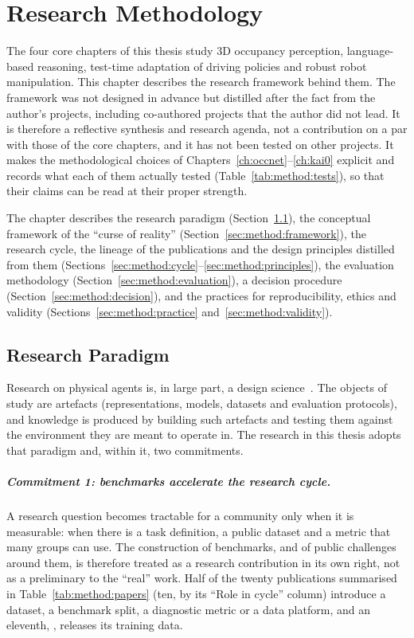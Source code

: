 \chapter{Research Methodology}\label{ch:methodology}

The four core chapters of this thesis study 3D occupancy perception, language-based reasoning, test-time adaptation of driving policies and robust robot manipulation. This chapter describes the research framework behind them. The framework was not designed in advance but distilled after the fact from the author's projects, including co-authored projects that the author did not lead. It is therefore a reflective synthesis and research agenda, not a contribution on a par with those of the core chapters, and it has not been tested on other projects. It makes the methodological choices of Chapters~\ref{ch:occnet}--\ref{ch:kai0} explicit and records what each of them actually tested (Table~\ref{tab:method:tests}), so that their claims can be read at their proper strength.

The chapter describes the research paradigm (Section~\ref{sec:method:paradigm}), the conceptual framework of the ``curse of reality'' (Section~\ref{sec:method:framework}), the research cycle, the lineage of the publications and the design principles distilled from them (Sections~\ref{sec:method:cycle}--\ref{sec:method:principles}), the evaluation methodology (Section~\ref{sec:method:evaluation}), a decision procedure (Section~\ref{sec:method:decision}), and the practices for reproducibility, ethics and validity (Sections~\ref{sec:method:practice} and~\ref{sec:method:validity}).

\section{Research Paradigm}\label{sec:method:paradigm}

Research on physical agents is, in large part, a design science~\cite{simon1996sciences,hevner2004design}. The objects of study are artefacts (representations, models, datasets and evaluation protocols), and knowledge is produced by building such artefacts and testing them against the environment they are meant to operate in. The research in this thesis adopts that paradigm and, within it, two commitments.

\paragraph{Commitment 1: benchmarks accelerate the research cycle.} A research question becomes tractable for a community only when it is measurable: when there is a task definition, a public dataset and a metric that many groups can use. The construction of benchmarks, and of public challenges around them, is therefore treated as a research contribution in its own right, not as a preliminary to the ``real'' work. Half of the twenty publications summarised in Table~\ref{tab:method:papers} (ten, by its ``Role in cycle'' column) introduce a dataset, a benchmark split, a diagnostic metric or a data platform, and an eleventh, \chiz, releases its training data.

